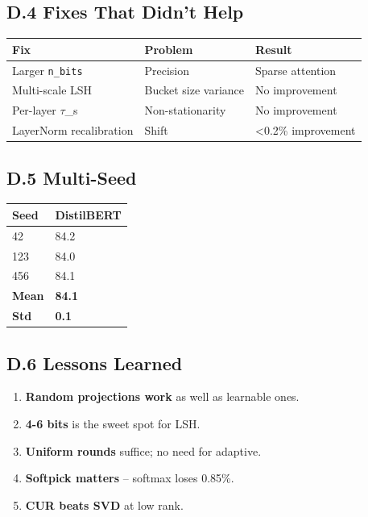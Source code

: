 \subsection{D.4 Fixes That Didn't Help}

\begin{table}[H]
\centering
\small
\begin{tabular}{lll}
\toprule
\textbf{Fix} & \textbf{Problem} & \textbf{Result} \\
\midrule
Larger \texttt{n\_bits} & Precision & Sparse attention \\
Multi-scale LSH & Bucket size variance & No improvement \\
Per-layer $\tau$\_s & Non-stationarity & No improvement \\
LayerNorm recalibration & Shift & \textless{}0.2\% improvement \\
\bottomrule
\end{tabular}
\end{table}

\subsection{D.5 Multi-Seed}

\begin{table}[H]
\centering
\small
\begin{tabular}{ll}
\toprule
\textbf{Seed} & \textbf{DistilBERT} \\
\midrule
42 & 84.2 \\
123 & 84.0 \\
456 & 84.1 \\
\textbf{Mean} & \textbf{84.1} \\
\textbf{Std} & \textbf{0.1} \\
\bottomrule
\end{tabular}
\end{table}

\subsection{D.6 Lessons Learned}

\begin{enumerate}
\item \textbf{Random projections work} as well as learnable ones.
\item \textbf{4-6 bits} is the sweet spot for LSH.
\item \textbf{Uniform rounds} suffice; no need for adaptive.
\item \textbf{Softpick matters} -- softmax loses 0.85\%.
\item \textbf{CUR beats SVD} at low rank.

\end{enumerate}
